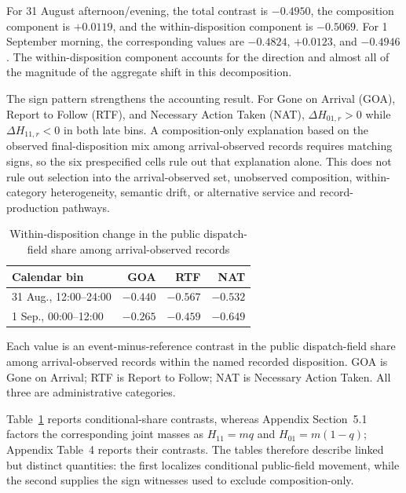 \documentclass[11pt]{article}
\begin{document}
For 31 August afternoon/evening, the total contrast is $-0.4950$, the composition component is $+0.0119$, and the within-disposition component is $-0.5069$. For 1 September morning, the corresponding values are $-0.4824$, $+0.0123$, and $-0.4946$. The within-disposition component accounts for the direction and almost all of the magnitude of the aggregate shift in this decomposition.

The sign pattern strengthens the accounting result. For Gone on Arrival (GOA), Report to Follow (RTF), and Necessary Action Taken (NAT), $\Delta H_{01,r}>0$ while $\Delta H_{11,r}<0$ in both late bins. A composition-only explanation based on the observed final-disposition mix among arrival-observed records requires matching signs, so the six prespecified cells rule out that explanation alone. This does not rule out selection into the arrival-observed set, unobserved composition, within-category heterogeneity, semantic drift, or alternative service and record-production pathways.

\begin{table}[H]
\centering
\caption{Within-disposition change in the public dispatch-field share among arrival-observed records}
\label{tab:disp}
\begin{tabular}{@{}lrrr@{}}
\toprule
Calendar bin & GOA & RTF & NAT \\
\midrule
31 Aug., 12:00--24:00 & $-0.440$ & $-0.567$ & $-0.532$ \\
1 Sep., 00:00--12:00 & $-0.265$ & $-0.459$ & $-0.649$ \\
\bottomrule
\end{tabular}
\begin{minipage}{0.94\textwidth}\footnotesize
Each value is an event-minus-reference contrast in the public dispatch-field share among arrival-observed records within the named recorded disposition. GOA is Gone on Arrival; RTF is Report to Follow; NAT is Necessary Action Taken. All three are administrative categories.
\end{minipage}
\end{table}

Table~\ref{tab:disp} reports conditional-share contrasts, whereas Appendix Section~5.1 factors the corresponding joint masses as $H_{11}=mq$ and $H_{01}=m(1-q)$; Appendix Table~4 reports their contrasts. The tables therefore describe linked but distinct quantities: the first localizes conditional public-field movement, while the second supplies the sign witnesses used to exclude composition-only.
\end{document}
